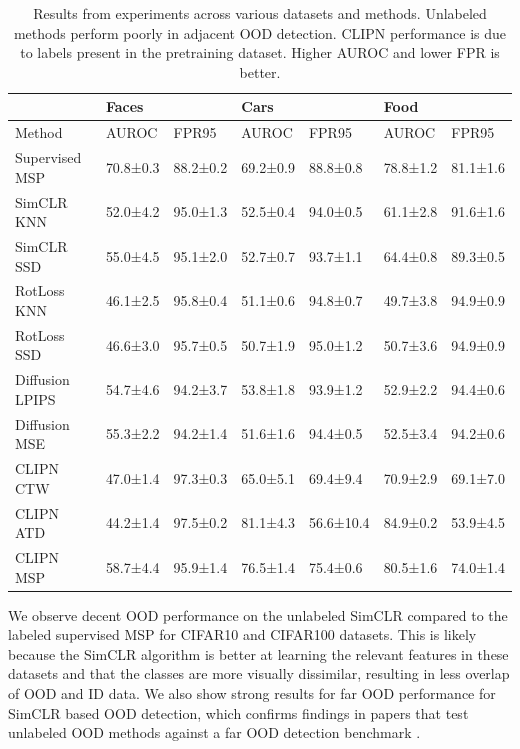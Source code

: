 \documentclass[11pt, oneside]{book}
\theoremstyle{plain}
\theoremstyle{definition}
\theoremstyle{remark}
\begin{document}
\begin{table}[h]
\caption{Results from experiments across various datasets and methods. Unlabeled methods perform poorly in adjacent OOD detection. CLIPN performance is due to labels present in the pretraining dataset. Higher AUROC and lower FPR is better.}
\vspace{2mm}
\centering
\begin{tabular}{l|ll|ll|ll}
\toprule
                & Faces    &          & Cars     &           & Food     &          \\ \hline
Method          & AUROC    & FPR95    & AUROC    & FPR95     & AUROC    & FPR95    \\ \midrule
Supervised MSP  & 70.8±0.3 & 88.2±0.2 & 69.2±0.9 & 88.8±0.8  & 78.8±1.2 & 81.1±1.6 \\ \midrule
SimCLR KNN      & 52.0±4.2 & 95.0±1.3 & 52.5±0.4 & 94.0±0.5  & 61.1±2.8 & 91.6±1.6 \\
SimCLR SSD      & 55.0±4.5 & 95.1±2.0 & 52.7±0.7 & 93.7±1.1  & 64.4±0.8 & 89.3±0.5 \\
RotLoss KNN     & 46.1±2.5 & 95.8±0.4 & 51.1±0.6 & 94.8±0.7  & 49.7±3.8 & 94.9±0.9 \\
RotLoss SSD     & 46.6±3.0 & 95.7±0.5 & 50.7±1.9 & 95.0±1.2  & 50.7±3.6 & 94.9±0.9 \\ \midrule
Diffusion LPIPS & 54.7±4.6 & 94.2±3.7 & 53.8±1.8 & 93.9±1.2  & 52.9±2.2 & 94.4±0.6 \\
Diffusion MSE   & 55.3±2.2 & 94.2±1.4 & 51.6±1.6 & 94.4±0.5  & 52.5±3.4 & 94.2±0.6 \\ \midrule
CLIPN CTW       & 47.0±1.4   & 97.3±0.3 & 65.0±5.1   & 69.4±9.4  & 70.9±2.9 & 69.1±7.0   \\
CLIPN ATD       & 44.2±1.4 & 97.5±0.2 & 81.1±4.3 & 56.6±10.4 & 84.9±0.2 & 53.9±4.5 \\
CLIPN MSP       & 58.7±4.4 & 95.9±1.4 & 76.5±1.4 & 75.4±0.6  & 80.5±1.6 & 74.0±1.4   \\ \bottomrule
\end{tabular}
\label{tab:results}
\end{table}

We observe decent OOD performance on the unlabeled SimCLR compared to the labeled supervised MSP for CIFAR10 and CIFAR100 datasets. This is likely because the SimCLR algorithm is better at learning the relevant features in these datasets and that the classes are more visually dissimilar, resulting in less overlap of OOD and ID data. We also show strong results for far OOD performance for SimCLR based OOD detection, which confirms findings in papers that test unlabeled OOD methods against a far OOD detection benchmark \citep{sehwag2021ssd, tack2020csi, liu2023unsupervised, guille2024cadet, wang2023clipn}.
\end{document}
